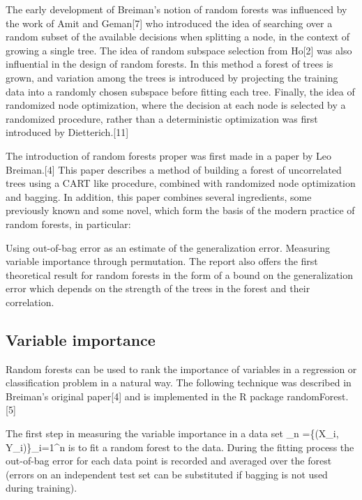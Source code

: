 
The early development of Breiman's notion of random forests was influenced by the work of Amit and Geman[7] who introduced the idea of searching over a random subset of the available decisions when splitting a node, in the context of growing a single tree. The idea of random subspace selection from Ho[2] was also influential in the design of random forests. In this method a forest of trees is grown, and variation among the trees is introduced by projecting the training data into a randomly chosen subspace before fitting each tree. Finally, the idea of randomized node optimization, where the decision at each node is selected by a randomized procedure, rather than a deterministic optimization was first introduced by Dietterich.[11]

The introduction of random forests proper was first made in a paper by Leo Breiman.[4] This paper describes a method of building a forest of uncorrelated trees using a CART like procedure, combined with randomized node optimization and bagging. In addition, this paper combines several ingredients, some previously known and some novel, which form the basis of the modern practice of random forests, in particular:

Using out-of-bag error as an estimate of the generalization error.
Measuring variable importance through permutation.
The report also offers the first theoretical result for random forests in the form of a bound on the generalization error which depends on the strength of the trees in the forest and their correlation.


\subsection{Variable importance}
Random forests can be used to rank the importance of variables in a regression or classification problem in a natural way. The following technique was described in Breiman's original paper[4] and is implemented in the R package randomForest.[5]

The first step in measuring the variable importance in a data set _n =\{(X_i, Y_i)\}_{i=1}^n is to fit a random forest to the data. During the fitting process the out-of-bag error for each data point is recorded and averaged over the forest (errors on an independent test set can be substituted if bagging is not used during training).

